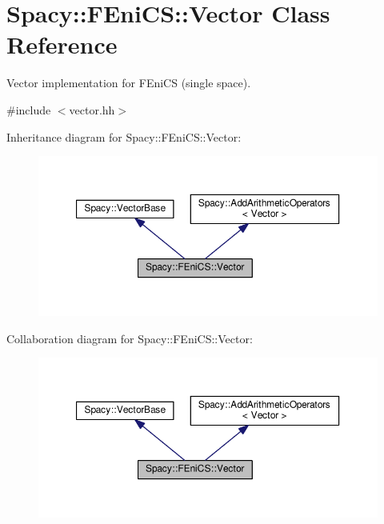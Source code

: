 \hypertarget{classSpacy_1_1FEniCS_1_1Vector}{}\section{Spacy\+:\+:F\+Eni\+CS\+:\+:Vector Class Reference}
\label{classSpacy_1_1FEniCS_1_1Vector}


Vector implementation for F\+Eni\+CS (single space).  




{\ttfamily \#include $<$vector.\+hh$>$}



Inheritance diagram for Spacy\+:\+:F\+Eni\+CS\+:\+:Vector\+:
\nopagebreak
\begin{figure}[H]
\begin{center}
\leavevmode
\includegraphics[width=350pt]{classSpacy_1_1FEniCS_1_1Vector__inherit__graph}
\end{center}
\end{figure}


Collaboration diagram for Spacy\+:\+:F\+Eni\+CS\+:\+:Vector\+:
\nopagebreak
\begin{figure}[H]
\begin{center}
\leavevmode
\includegraphics[width=350pt]{classSpacy_1_1FEniCS_1_1Vector__coll__graph}
\end{center}
\end{figure}
